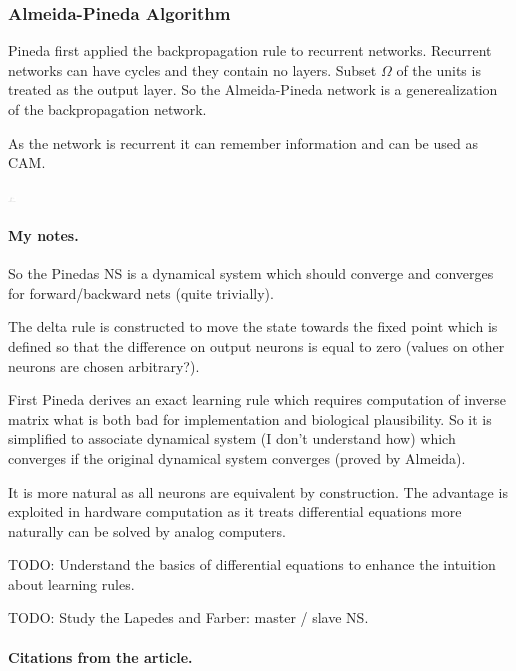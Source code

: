 \subsubsection{Almeida-Pineda Algorithm}

Pineda first applied the backpropagation rule to recurrent networks. Recurrent networks can have cycles and they contain no layers. Subset $\Omega$ of the units is treated as the output layer. So the Almeida-Pineda network is a generealization of the backpropagation network. 

As the network is recurrent it can remember information and can be used as CAM.

\includegraphics[width=8px]{img/recurrent.png}

\paragraph{My notes.} 
So the Pinedas NS is a dynamical system which should converge and converges for forward/backward nets (quite trivially). 

The delta rule is constructed to move the state towards the fixed point which is defined so that the difference on output neurons is equal to zero (values on other neurons are chosen arbitrary?). 

First Pineda derives an exact learning rule which requires computation of inverse matrix what is both bad for implementation and biological plausibility. So it is simplified to associate dynamical system (I don't understand how) which converges if the original dynamical system converges (proved by Almeida). 

It is more natural as all neurons are equivalent by construction. The advantage is exploited in hardware computation as it treats differential equations more naturally can be solved by analog computers. 



TODO: Understand the basics of differential equations to enhance the intuition about learning rules. 

TODO: Study the Lapedes and Farber: master / slave NS. 

\paragraph{Citations from the article.}

